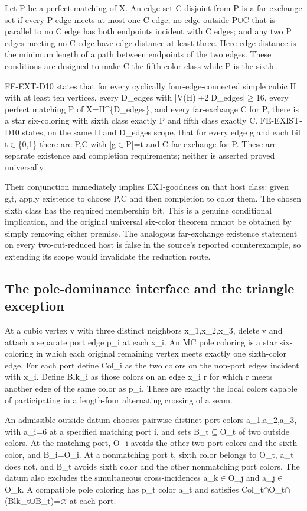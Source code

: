 \documentclass[11pt,a4paper]{article}
\begin{document}
Let P be a perfect matching of X. An edge set C disjoint from P is a far-exchange set if every P edge meets at most one C edge; no edge outside P\ensuremath{\cup}C that is parallel to no C edge has both endpoints incident with C edges; and any two P edges meeting no C edge have edge distance at least three. Here edge distance is the minimum length of a path between endpoints of the two edges. These conditions are designed to make C the fifth color class while P is the sixth.

FE-EXT-D10 states that for every cyclically four-edge-connected simple cubic H with at least ten vertices, every D\_edges with |V(H)|+2|D\_edges|\ensuremath{\geq}16, every perfect matching P of X=H\textasciicircum{}\{D\_edges\}, and every far-exchange C for P, there is a star six-coloring with sixth class exactly P and fifth class exactly C. FE-EXIST-D10 states, on the same H and D\_edges scope, that for every edge g and each bit t\ensuremath{\in}\{0,1\} there are P,C with [g\ensuremath{\in}P]=t and C far-exchange for P. These are separate existence and completion requirements; neither is asserted proved universally.

Their conjunction immediately implies EX1-goodness on that host class: given g,t, apply existence to choose P,C and then completion to color them. The chosen sixth class has the required membership bit. This is a genuine conditional implication, and the original universal six-color theorem cannot be obtained by simply removing either premise. The analogous far-exchange existence statement on every two-cut-reduced host is false in the source's reported counterexample, so extending its scope would invalidate the reduction route.

\subsection{The pole-dominance interface and the triangle exception}
At a cubic vertex v with three distinct neighbors x\_1,x\_2,x\_3, delete v and attach a separate port edge p\_i at each x\_i. An MC pole coloring is a star six-coloring in which each original remaining vertex meets exactly one sixth-color edge. For each port define Col\_i as the two colors on the non-port edges incident with x\_i. Define Blk\_i as those colors on an edge x\_i r for which r meets another edge of the same color as p\_i. These are exactly the local colors capable of participating in a length-four alternating crossing of a seam.

An admissible outside datum chooses pairwise distinct port colors a\_1,a\_2,a\_3, with a\_i=6 at a specified matching port i, and sets B\_t\ensuremath{\subseteq}O\_t of two outside colors. At the matching port, O\_i avoids the other two port colors and the sixth color, and B\_i=O\_i. At a nonmatching port t, sixth color belongs to O\_t, a\_t does not, and B\_t avoids sixth color and the other nonmatching port colors. The datum also excludes the simultaneous cross-incidences a\_k\ensuremath{\in}O\_j and a\_j\ensuremath{\in}O\_k. A compatible pole coloring has p\_t color a\_t and satisfies Col\_t\ensuremath{\cap}O\_t\ensuremath{\cap}(Blk\_t\ensuremath{\cup}B\_t)=\ensuremath{\varnothing} at each port.
\end{document}
